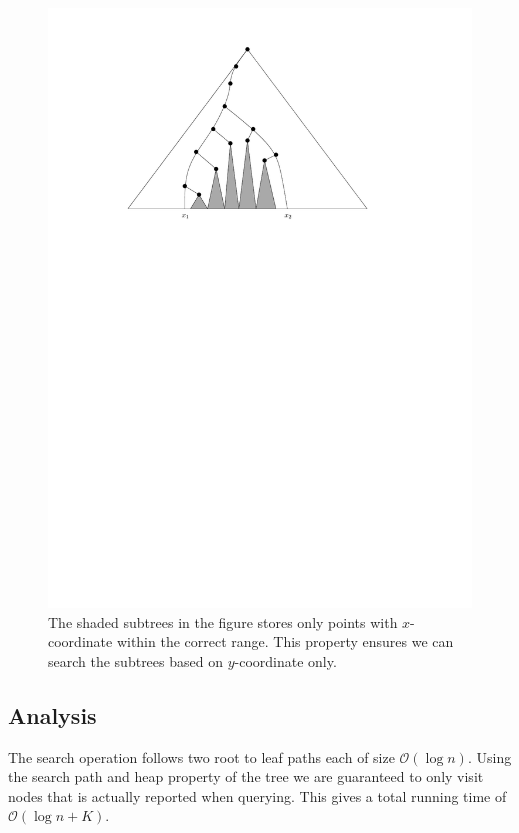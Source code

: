\documentclass[twoside,11pt,openright]{report}
\begin{document}
\begin{figure}[h]
	\centering
	\includegraphics[scale=0.7]{../figures/internal_pst_query}
	\caption{The shaded subtrees in the figure stores only points with $x$-coordinate within the correct range. This property ensures we can search the subtrees based on $y$-coordinate only.}
	\label{fig:static_pst_query}
\end{figure}

\subsection*{Analysis}
The search operation follows two root to leaf paths each of size $\mathcal{O}(\log n)$. Using the search path and heap property of the tree we are guaranteed to only visit nodes that is actually reported when querying. This gives a total running time of $\mathcal{O}(\log n + K)$.
\end{document}
